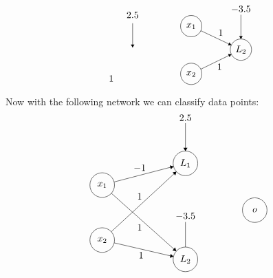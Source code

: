 \documentclass[12]{article}
\begin{document}
\begin{enumerate}[label=\textbf{(\alph*)}]
\[\begin{tikzpicture}[scale=0.13]
			\draw (30.59,-35.81) node [below] {$1$};
			\draw [black] (36.6,-22.1) -- (36.6,-28.9);
			\draw (36.6,-21.6) node [above] {$2.5$};
			\fill [black] (36.6,-28.9) -- (37.1,-28.1) -- (36.1,-28.1);
		\end{tikzpicture}
		\qquad \qquad
		\begin{tikzpicture}[scale=0.13]
			\tikzstyle{every node}+=[inner sep=0pt]
			\draw [black] (22.6,-25.3) circle (3);
			\draw (22.6,-25.3) node {$x_1$};
			\draw [black] (22.6,-38.7) circle (3);
			\draw (22.6,-38.7) node {$x_2$};
			\draw [black] (36.6,-31.9) circle (3);
			\draw (36.6,-31.9) node {$L_2$};
			\draw [black] (25.31,-26.58) -- (33.89,-30.62);
			\fill [black] (33.89,-30.62) -- (33.38,-29.83) -- (32.95,-30.73);
			\draw (30.91,-28.09) node [above] {$1$};
			\draw [black] (25.3,-37.39) -- (33.9,-33.21);
			\fill [black] (33.9,-33.21) -- (32.96,-33.11) -- (33.4,-34.01);
			\draw (30.59,-35.81) node [below] {$1$};
			\draw [black] (36.6,-22.1) -- (36.6,-28.9);
			\draw (36.6,-21.6) node [above] {$-3.5$};
			\fill [black] (36.6,-28.9) -- (37.1,-28.1) -- (36.1,-28.1);
		\end{tikzpicture}
		\]
		Now with the following network we can classify data points:
		\[
		\begin{tikzpicture}[scale=0.15]
			\tikzstyle{every node}+=[inner sep=0pt]
			\draw [black] (22.6,-25.3) circle (3);
			\draw (22.6,-25.3) node {$x_1$};
			\draw [black] (22.6,-38.7) circle (3);
			\draw (22.6,-38.7) node {$x_2$};
			\draw [black] (42.9,-20) circle (3);
			\draw (42.9,-20) node {$L_1$};
			\draw [black] (42.9,-43.4) circle (3);
			\draw (42.9,-43.4) node {$L_2$};
			\draw [black] (59.8,-31.4) circle (3);
			\draw (59.8,-31.4) node {$o$};
			\draw [black] (25.5,-24.54) -- (40,-20.76);
			\fill [black] (40,-20.76) -- (39.1,-20.48) -- (39.35,-21.44);
			\draw (31.75,-22.06) node [above] {$-1$};
			\draw [black] (24.81,-36.67) -- (40.69,-22.03);
			\fill [black] (40.69,-22.03) -- (39.77,-22.21) -- (40.44,-22.94);
			\draw (31.73,-28.86) node [above] {$1$};
			\draw [black] (42.9,-10.2) -- (42.9,-17);
			\draw (42.9,-9.7) node [above] {$2.5$};
			\fill [black] (42.9,-17) -- (43.4,-16.2) -- (42.4,-16.2);
			\draw [black] (24.84,-27.3) -- (40.66,-41.4);
			\fill [black] (40.66,-41.4) -- (40.4,-40.5) -- (39.73,-41.24);
			\draw (31.74,-34.84) node [below] {$1$};
			\draw [black] (25.52,-39.38) -- (39.98,-42.72);
			\fill [black] (39.98,-42.72) -- (39.31,-42.06) -- (39.09,-43.03);
			\draw (32.08,-41.63) node [below] {$1$};
			\draw [black] (42.9,-34.3) -- (42.9,-40.4);
			\draw (42.9,-33.8) node [above] {$-3.5$};

\end{tikzpicture}\]
\end{enumerate}
\end{document}
